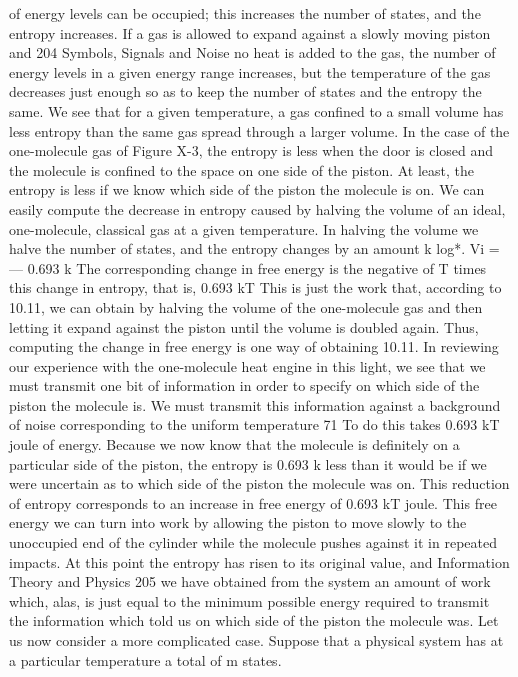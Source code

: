 {{{{{{{{{{{of energy levels can be occupied; this increases the
number of states, and the entropy increases.
If a gas is allowed to expand against a slowly moving piston and
204
Symbols, Signals and Noise
no heat is added to the gas, the number of energy levels in a given
energy range increases, but the temperature of the gas decreases
just enough so as to keep the number of states and the entropy
the same.
We see that for a given temperature, a gas confined to a small
volume has less entropy than the same gas spread through a larger
volume. In the case of the one-molecule gas of Figure X-3, the
entropy is less when the door is closed and the molecule is confined
to the space on one side of the piston. At least, the entropy is less
if we know which side of the piston the molecule is on.
We can easily compute the decrease in entropy caused by halving
the volume of an ideal, one-molecule, classical gas at a given
temperature. In halving the volume we halve the number of states,
and the entropy changes by an amount
k log*. Vi = — 0.693 k
The corresponding change in free energy is the negative of T times
this change in entropy, that is,
0.693 kT
This is just the work that, according to 10.11, we can obtain by
halving the volume of the one-molecule gas and then letting it
expand against the piston until the volume is doubled again. Thus,
computing the change in free energy is one way of obtaining 10.11.
In reviewing our experience with the one-molecule heat engine
in this light, we see that we must transmit one bit of information
in order to specify on which side of the piston the molecule is. We
must transmit this information against a background of noise
corresponding to the uniform temperature 71 To do this takes
0.693 kT joule of energy.
Because we now know that the molecule is definitely on a particular
side of the piston, the entropy is 0.693 k less than it would
be if we were uncertain as to which side of the piston the molecule
was on. This reduction of entropy corresponds to an increase in free
energy of 0.693 kT joule. This free energy we can turn into work
by allowing the piston to move slowly to the unoccupied end of
the cylinder while the molecule pushes against it in repeated impacts.
At this point the entropy has risen to its original value, and
Information Theory and Physics
205
we have obtained from the system an amount of work which, alas,
is just equal to the minimum possible energy required to transmit
the information which told us on which side of the piston the
molecule was.
Let us now consider a more complicated case. Suppose that a
physical system has at a particular temperature a total of m states.
}}}}}}}}}}}
